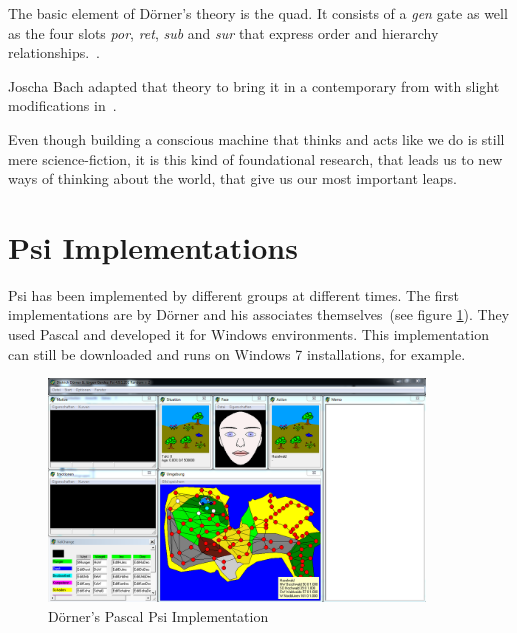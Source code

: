 The basic element of Dörner's theory is the quad. It consists of a \emph{gen} gate as well as the four slots \emph{por}, \emph{ret}, \emph{sub} and \emph{sur} that express order and hierarchy relationships.~\cite{Bach:2009:PSI:1611304}.


Joscha Bach adapted that theory to bring it in a contemporary from with slight modifications in~\cite{Bach:2009:PSI:1611304}.


Even though building a conscious machine that thinks and acts like we do is still mere science-fiction, it is this kind of foundational research, that leads us to new ways of thinking about the world, that give us our most important leaps.



    \section{Psi Implementations}
Psi has been implemented by different groups at different times. The first implementations are by Dörner and his associates themselves~(see figure \ref{psi_screen}). They used Pascal and developed it for Windows environments. This implementation can still be downloaded and runs on Windows 7 installations, for example. %

\begin{figure}[h]
  \centering
    \includegraphics[width=10cm]{graphics/psi_screen1}
  \caption{Dörner's Pascal Psi Implementation}
  \label{psi_screen}
\end{figure}

